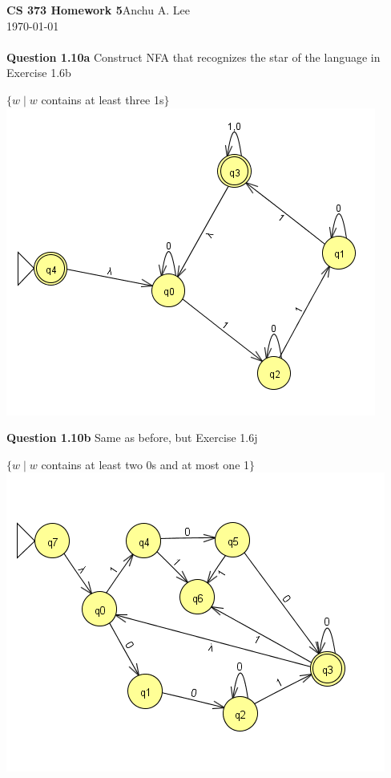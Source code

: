 \documentclass{article}
\begin{document}
    \noindent\textbf{CS 373 Homework 5}\hfill Anchu A. Lee\\
    \noindent\today\\\\
    \noindent\textbf{Question 1.10a} Construct NFA that recognizes the star of the language in Exercise 1.6b
        \begin{center}
            $\{w\mid w$ contains at least three 1s$\}$\\
            \includegraphics[scale=0.5]{q1}
        \end{center}
    \textbf{Question 1.10b} Same as before, but Exercise 1.6j
        \begin{center}
            $\{w\mid w $ contains at least two 0s and at most one 1$ \}$\\
            \includegraphics[scale=0.5]{q2}
        \end{center}
\end{document}
